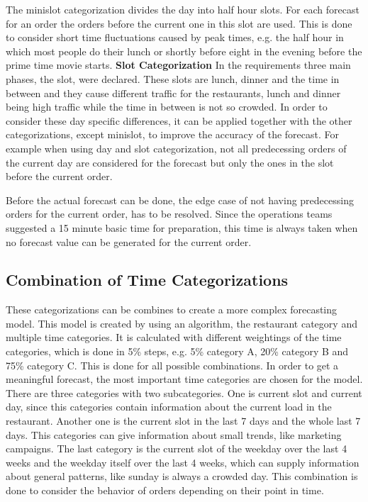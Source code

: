 The minislot categorization divides the day into half hour slots. For each forecast for an order the orders before the current one in this slot are used. This is done to consider short time fluctuations caused by peak times, e.g. the half hour in which most people do their lunch or shortly before eight in the evening before the prime time movie starts.
\newline\textbf{Slot Categorization}\newline
In the requirements three main phases, the slot, were declared. These slots are lunch, dinner and the time in between and they cause different traffic for the restaurants, lunch and dinner being high traffic while the time in between is not so crowded. In order to consider these day specific differences, it can be applied together with the other categorizations, except minislot, to improve the accuracy of the forecast. For example when using day and slot categorization, not all predecessing orders of the current day are considered for the forecast but only the ones in the slot before the current order.

\newline
Before the actual forecast can be done, the edge case of not having predecessing orders for the current order, has to be resolved. Since the operations teams suggested a 15 minute basic time for preparation, this time is always taken when no forecast value can be generated for the current order.
\subsection{Combination of Time Categorizations}\label{subsection:Categorizing by Order}
These categorizations can be combines to create a more complex forecasting model. This model is created by using an algorithm, the restaurant category and multiple time categories. It is calculated with different weightings of the time categories, which is done in 5\% steps, e.g. 5\% category A, 20\% category B and 75\% category C. This is done for all possible combinations. In order to get a meaningful forecast, the most important time categories are chosen for the model. There are three categories with two subcategories. One is current slot and current day, since this categories contain information about the current load in the restaurant. Another one is the current slot in the last 7 days and the whole last 7 days. This categories can give information about small trends, like marketing campaigns. The last category is the current slot of the weekday over the last 4 weeks and the weekday itself over the last 4 weeks, which can supply information about general patterns, like sunday is always a crowded day.\newline
This combination is done to consider the behavior of orders depending on their point in time.
